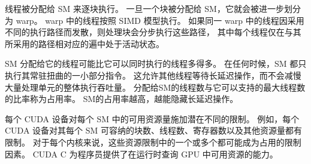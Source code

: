 线程被分配给 SM 来逐块执行。 一旦一个块被分配给 SM，它就会被进一步划分为 warp。 
warp 中的线程按照 SIMD 模型执行。 如果同一 warp 中的线程因采用不同的执行路径而发散，则处理块会分步执行这些路径，
其中每个线程仅在与其所采用的路径相对应的遍中处于活动状态。

SM 分配给它的线程可能比它可以同时执行的线程多得多。 在任何时候，SM 都只执行其常驻扭曲的一小部分指令。 
这允许其他线程等待长延迟操作，而不会减慢大量处理单元的整体执行吞吐量。 
分配给SM的线程数与它可以支持的最大线程数的比率称为占用率。 SM的占用率越高，越能隐藏长延迟操作。

每个 CUDA 设备对每个 SM 中的可用资源量施加潜在不同的限制。 
例如，每个 CUDA 设备对其每个 SM 可容纳的块数、线程数、寄存器数以及其他资源量都有限制。 
对于每个内核来说，这些资源限制中的一个或多个都可能成为占用的限制因素。 
CUDA C 为程序员提供了在运行时查询 GPU 中可用资源的能力。
